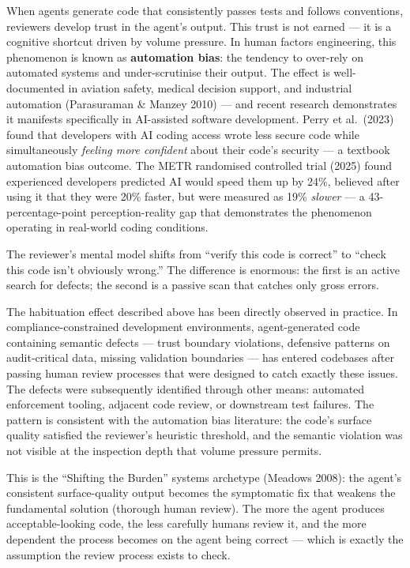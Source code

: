 \documentclass[a4paper,11pt]{report}
\begin{document}
When agents generate code that consistently passes tests and follows
conventions, reviewers develop trust in the agent's output. This trust
is not earned --- it is a cognitive shortcut driven by volume pressure.
In human factors engineering, this phenomenon is known as
\textbf{automation bias}: the tendency to over-rely on automated systems
and under-scrutinise their output. The effect is well-documented in
aviation safety, medical decision support, and industrial automation
(Parasuraman \& Manzey 2010) --- and recent research demonstrates it
manifests specifically in AI-assisted software development. Perry et
al.~(2023) found that developers with AI coding access wrote less secure
code while simultaneously \emph{feeling more confident} about their
code's security --- a textbook automation bias outcome. The METR
randomised controlled trial (2025) found experienced developers
predicted AI would speed them up by 24\%, believed after using it that
they were 20\% faster, but were measured as 19\% \emph{slower} --- a
43-percentage-point perception-reality gap that demonstrates the
phenomenon operating in real-world coding conditions.

The reviewer's mental model shifts from ``verify this code is correct''
to ``check this code isn't obviously wrong.'' The difference is
enormous: the first is an active search for defects; the second is a
passive scan that catches only gross errors.

The habituation effect described above has been directly observed in
practice. In compliance-constrained development environments,
agent-generated code containing semantic defects --- trust boundary
violations, defensive patterns on audit-critical data, missing
validation boundaries --- has entered codebases after passing human
review processes that were designed to catch exactly these issues. The
defects were subsequently identified through other means: automated
enforcement tooling, adjacent code review, or downstream test failures.
The pattern is consistent with the automation bias literature: the
code's surface quality satisfied the reviewer's heuristic threshold, and
the semantic violation was not visible at the inspection depth that
volume pressure permits.

This is the ``Shifting the Burden'' systems archetype (Meadows 2008):
the agent's consistent surface-quality output becomes the symptomatic
fix that weakens the fundamental solution (thorough human review). The
more the agent produces acceptable-looking code, the less carefully
humans review it, and the more dependent the process becomes on the
agent being correct --- which is exactly the assumption the review
process exists to check.
\end{document}
